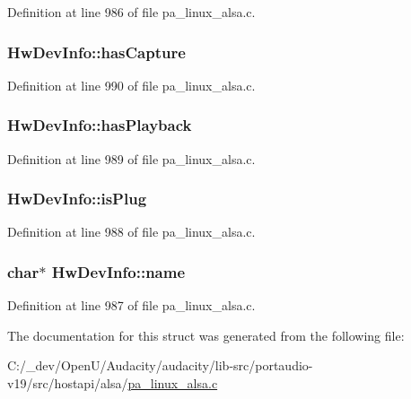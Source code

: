 Definition at line 986 of file pa\+\_\+linux\+\_\+alsa.\+c.

\subsubsection[{\texorpdfstring{has\+Capture}{hasCapture}}]{ Hw\+Dev\+Info\+::has\+Capture}\hypertarget{struct_hw_dev_info_a80ee49eb62fed3f40aa4e49591c23980}{}\label{struct_hw_dev_info_a80ee49eb62fed3f40aa4e49591c23980}


Definition at line 990 of file pa\+\_\+linux\+\_\+alsa.\+c.

\subsubsection[{\texorpdfstring{has\+Playback}{hasPlayback}}]{ Hw\+Dev\+Info\+::has\+Playback}\hypertarget{struct_hw_dev_info_a11200ea7796a9a1c1a44a23e03eef21e}{}\label{struct_hw_dev_info_a11200ea7796a9a1c1a44a23e03eef21e}


Definition at line 989 of file pa\+\_\+linux\+\_\+alsa.\+c.

\subsubsection[{\texorpdfstring{is\+Plug}{isPlug}}]{ Hw\+Dev\+Info\+::is\+Plug}\hypertarget{struct_hw_dev_info_a3afbd357df38d146cf8d223cbbe4930f}{}\label{struct_hw_dev_info_a3afbd357df38d146cf8d223cbbe4930f}


Definition at line 988 of file pa\+\_\+linux\+\_\+alsa.\+c.

\subsubsection[{\texorpdfstring{name}{name}}]{\setlength{\rightskip}{0pt plus 5cm}char$\ast$ Hw\+Dev\+Info\+::name}\hypertarget{struct_hw_dev_info_ada014cb1067ae4696a3f7b5e40819971}{}\label{struct_hw_dev_info_ada014cb1067ae4696a3f7b5e40819971}


Definition at line 987 of file pa\+\_\+linux\+\_\+alsa.\+c.



The documentation for this struct was generated from the following file\+:\begin{DoxyCompactItemize}
\item 
C\+:/\+\_\+dev/\+Open\+U/\+Audacity/audacity/lib-\/src/portaudio-\/v19/src/hostapi/alsa/\hyperlink{pa__linux__alsa_8c}{pa\+\_\+linux\+\_\+alsa.\+c}\end{DoxyCompactItemize}
